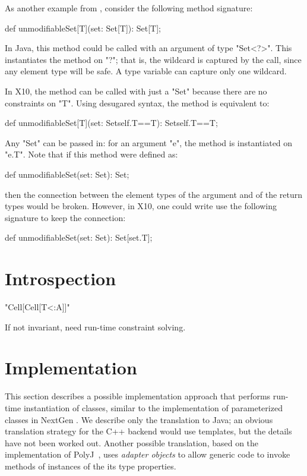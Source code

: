 \documentclass[nocopyrightspace,9pt]{sigplanconf}
\newif\ifsemantics
\begin{document}
As another example from \cite{adding-wildcards}, consider
the following method signature:
\begin{xten}
def unmodifiableSet[T](set: Set[T]): Set[T];
\end{xten}

In Java, this method could be called with an argument of
type \xcd"Set<?>".
This instantiates the method on \xcd"?"; that is, the
wildcard is captured by the call, since any element type will be
safe.  A type variable can capture only one wildcard.

In X10, the method can be called with just a \xcd"Set" because there
are no constraints on \xcd"T".  Using desugared syntax, the method is
equivalent to: 
\begin{xten}
def unmodifiableSet[T](set: Set{self.T==T}): Set{self.T==T};
\end{xten}
Any \xcd"Set" can be passed in: for an argument \xcd"e", the method
is instantiated on \xcd"e.T".
%
Note that if this method were defined as:
\begin{xten}
def unmodifiableSet(set: Set): Set;
\end{xten}
then the connection between the element types of the
argument and of the return types would be broken.
However, in X10, one could write use the following signature to keep the
connection:
\begin{xten}
def unmodifiableSet(set: Set): Set[set.T];
\end{xten}

\section{Introspection}

\xcd"Cell[Cell[T<:A]]"

If not invariant, need run-time constraint solving.
\fi

\ifsemantics

\section{Semantics}


\fi

\section{Implementation}

This section describes a possible implementation approach that
performs
run-time instantiation of classes, similar to the implementation
of parameterized classes in NextGen \cite{allen03,allen04}.
We describe only the translation to Java; an obvious
translation strategy for the C++ backend would use templates,
but the details have not been worked out.
Another possible translation, 
based on the implementation of PolyJ~\cite{polyj},
uses \emph{adapter objects} to allow generic code to invoke
methods of instances of the its type properties.
\end{document}
